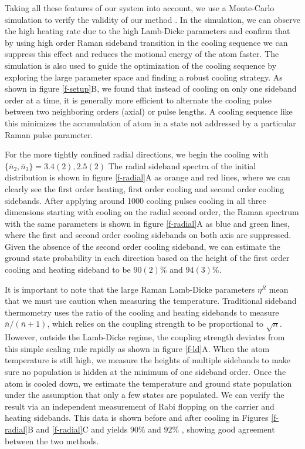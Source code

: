 \documentclass[aps,prl,twocolumn,groupedaddress]{revtex4-1}
\begin{document}
Taking all these features of our system into account, we use a Monte-Carlo simulation to verify
the validity of our method .
In the simulation, we can observe the high heating rate due to the high Lamb-Dicke parameters
and confirm that by using high order Raman sideband transition in the cooling sequence we can
suppress this effect and reduces the motional energy of the atom faster.
The simulation is also used to guide the optimization of the cooling sequence by exploring the
large parameter space and finding a robust cooling strategy. As shown in figure \ref{f-setup}B,
we found that instead of cooling on only one sideband order at a time, it is generally more
efficient to alternate the cooling pulse between two neighboring orders (axial) or pulse lengths.
A cooling sequence like this minimizes the accumulation of atom in a state not addressed by a
particular Raman pulse parameter.

For the more tightly confined radial directions,
we begin the cooling with $\{\bar n_2, \bar n_3\}=3.4(2), 2.5(2)$
The radial sideband spectra of the initial distribution is shown in figure \ref{f-radial}A
as orange and red lines, where we can clearly see the first order heating,
first order cooling and second order cooling sidebands.
After applying around 1000 cooling pulses cooling in all three dimensions
starting with cooling on the radial second order,
the Raman spectrum with the same parameters is shown in figure \ref{f-radial}A as
blue and green lines, where the first and second order cooling sidebands
on both axis are suppressed.
Given the absence of the second order cooling sideband,
we can estimate the ground state probability in each direction based on the height of
the first order cooling and heating sideband to be $90(2)\%$ and $94(3)\%$.

It is important to note that the large Raman Lamb-Dicke parameters $\eta^R$ mean that
we must use caution when measuring the temperature.
Traditional sideband thermometry uses
the ratio of the cooling and heating sidebands to measure $\bar n / (\bar n + 1)$, which relies
on the coupling strength to be proportional to $\sqrt{n}$. However, outside the
Lamb-Dicke regime, the coupling strength deviates from this simple scaling rule rapidly as
shown in figure \ref{f-ld}A.
When the atom temperature is still high,
we measure the heights of multiple sidebands to make sure no population is hidden at the
minimum of one sideband order. Once the atom is cooled down, we estimate the temperature
and ground state population under the assumption that only a few states are populated.
We can verify the result via an independent measurement of Rabi flopping on the carrier and heating
sidebands. This data is shown before and after cooling in Figures
\ref{f-radial}B and \ref{f-radial}C and yields $90\%$ and $92\%$ ,
showing good agreement between the two methods.
\end{document}

